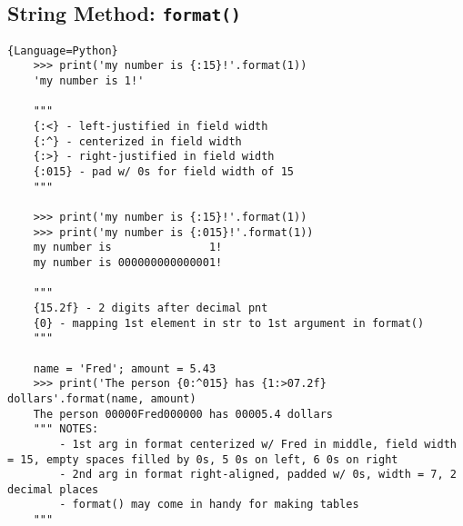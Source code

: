 \documentclass{article}
\begin{document}
    
\subsection{String Method: \texttt{format()}}
\begin{lstlisting}{Language=Python}
    >>> print('my number is {:15}!'.format(1))
    'my number is 1!'
    
    """
    {:<} - left-justified in field width
    {:^} - centerized in field width
    {:>} - right-justified in field width
    {:015} - pad w/ 0s for field width of 15
    """
    
    >>> print('my number is {:15}!'.format(1))
    >>> print('my number is {:015}!'.format(1))
    my number is               1!
    my number is 000000000000001!
    
    """
    {15.2f} - 2 digits after decimal pnt
    {0} - mapping 1st element in str to 1st argument in format()
    """
    
    name = 'Fred'; amount = 5.43
    >>> print('The person {0:^015} has {1:>07.2f} dollars'.format(name, amount)
    The person 00000Fred000000 has 00005.4 dollars
    """ NOTES:
        - 1st arg in format centerized w/ Fred in middle, field width = 15, empty spaces filled by 0s, 5 0s on left, 6 0s on right
        - 2nd arg in format right-aligned, padded w/ 0s, width = 7, 2 decimal places
        - format() may come in handy for making tables
    """
\end{lstlisting}

\end{document}
